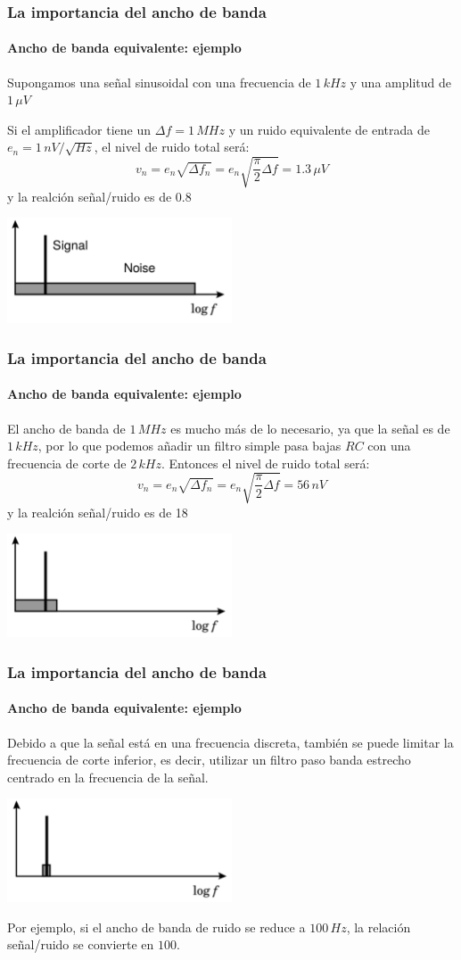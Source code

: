 \documentclass{beamer}
\begin{document}
\begin{frame}
\frametitle{La importancia del ancho de banda}
\framesubtitle{Ancho de banda equivalente: ejemplo}
Supongamos una señal sinusoidal con una frecuencia de $1\,kHz$ y una amplitud de
$1\,\mu V$ 

Si el amplificador tiene un $\Delta f = 1\,MHz$ y un ruido
equivalente de entrada de $e_n = 1\,nV/\sqrt{Hz}$, el nivel de ruido total será:
$$v_n = e_n \sqrt{\Delta f_n} = e_n \sqrt{\frac{\pi}{2}\Delta f} = 1.3\,\mu V$$
 y la realción señal/ruido es de 0.8
\begin{center}
\includegraphics[width=0.5\textwidth]{d1/ej_ruido1}
\end{center}
\end{frame} 

\begin{frame}
\frametitle{La importancia del ancho de banda}
\framesubtitle{Ancho de banda equivalente: ejemplo}
El ancho de banda de $1\,MHz$ es mucho más de lo necesario, ya que la señal es
de $1\,kHz$, por lo que podemos añadir un filtro simple pasa bajas $RC$ con una
frecuencia de corte de $2\,kHz$. Entonces el nivel de ruido total será:
$$v_n = e_n \sqrt{\Delta f_n} = e_n \sqrt{\frac{\pi}{2}\Delta f} = 56\,nV$$
 y la realción señal/ruido es de 18
\begin{center}
\includegraphics[width=0.5\textwidth]{d1/ej_ruido2}
\end{center}
\end{frame} 

\begin{frame}
\frametitle{La importancia del ancho de banda}
\framesubtitle{Ancho de banda equivalente: ejemplo}
Debido a que la señal está en una frecuencia discreta, también se puede limitar la
frecuencia de corte inferior, es decir, utilizar un filtro paso banda estrecho
centrado en la frecuencia de la señal.
\begin{center}
\includegraphics[width=0.5\textwidth]{d1/ej_ruido3}
\end{center}
Por ejemplo, si el ancho de banda de ruido se reduce a $100\, Hz$, la relación
señal/ruido se convierte en $100$.
\end{frame} 
\end{document}
